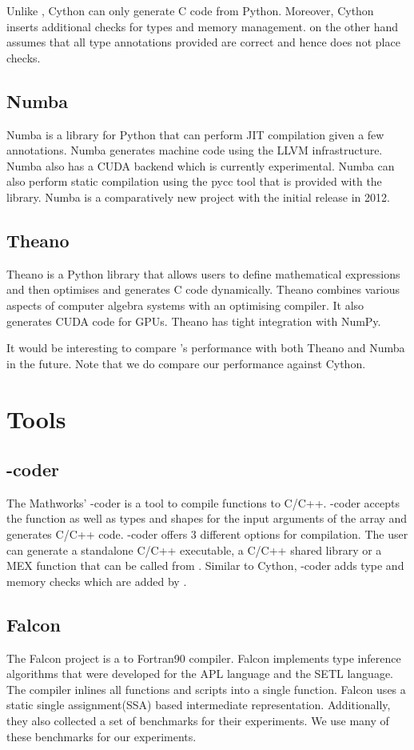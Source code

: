 Unlike \velocty, Cython can only generate C code from Python. Moreover, Cython inserts additional checks for types and memory management. \velocty on the other hand assumes that all type annotations provided are correct and hence does not place checks.
\subsection{Numba}
Numba\cite{numba} is a library for Python that can perform JIT compilation given a few annotations. Numba generates machine code using the LLVM\cite{Lattner:2004:LCF:977395.977673} infrastructure. Numba also has a CUDA\cite{Nickolls:2008:SPP:1365490.1365500} backend which is currently experimental. Numba can also perform static compilation using the pycc tool that is provided with the library. Numba is a comparatively new project with the initial release in 2012. 
\subsection{Theano}
Theano\cite{Bastien-Theano-2012} is a Python library that allows users to define mathematical expressions and then optimises and generates C code dynamically. Theano combines various aspects of computer algebra systems with an optimising compiler. It also generates CUDA code for GPUs. Theano has tight integration with NumPy.

It would be interesting to compare \velocty's performance with both Theano and Numba in the future. Note that we do compare our performance against Cython. 

\section{\matlab Tools}
\subsection{\matlab-coder}
The Mathworks' \matlab-coder\cite{matlab-coder} is a tool to compile \matlab functions to C/C++. \matlab-coder accepts the \matlab function as well as types and shapes for the input arguments of the array and generates C/C++ code. \matlab-coder offers 3 different options for compilation. The user can generate a standalone C/C++ executable, a C/C++ shared library or a MEX\cite{mex} function that can be called from \matlab. Similar to Cython, \matlab-coder adds type and memory checks which are added by \velocty.
\subsection{Falcon}
The Falcon project\cite{DeRose:1999} is a \matlab to Fortran90 compiler. Falcon implements type inference algorithms that were developed for the APL\cite{Budd:1983:ACU:390005.801218,Joisha:2000:CDI:570406.570408,Weiss:1981:CTS:390007.805380} language and the SETL\cite{Schwartz:1975:ADS:512976.512981} language. The compiler inlines all functions and scripts into a single function. Falcon uses a static single assignment(SSA) based intermediate representation. Additionally, they also collected a set of benchmarks for their experiments. We use many of these benchmarks for our experiments. 
